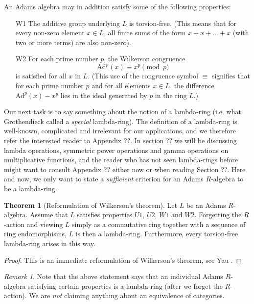 \documentclass[a4paper]{article}
\theoremstyle{definition}
\newtheorem{theorem}{Theorem}[section]
\theoremstyle{remark}
\newtheorem*{remark}{Remark}
\newcommand{\ad}[1]{\text{Ad}^{#1}}
\begin{document}
An Adams algebra may in addition satisfy some of the following properties:

\begin{itemize}
\item[W1] The additive group underlying $L$ is torsion-free. (This means that for every non-zero element $x \in L$, all finite sums of the form $x+x+ \ldots +x$ (with two or more terms) are also non-zero).
\item[W2] For each prime number $p$, the Wilkerson congruence
$$  \ad{p}(x) \equiv x^p \pmod p  $$
is satisfied for all $x$ in $L$. (This use of the congruence symbol $\equiv$ signifies that for each prime number $p$ and for all elements $x \in L$, the difference $\ad{p}(x) -  x^p$ lies in the ideal generated by $p$ in the ring $L$.)
\end{itemize}

Our next task is to say something about the notion of a lambda-ring (i.e. what Grothendieck called a \emph{special} lambda-ring). The definition of a lambda-ring is well-known, complicated and irrelevant for our applications, and we therefore refer the interested reader to Appendix ??. In section ?? we will be discussing lambda operations, symmetric power operations and gamma operations on multiplicative functions, and the reader who has not seen lambda-rings before might want to consult Appendix ?? either now or when reading Section ??. Here and now, we only want to state a \emph{sufficient} criterion for an Adams $R$-algebra to be a lambda-ring.

\begin{theorem}[Reformulation of Wilkerson's theorem]
Let $L$ be an Adams $R$-algebra. Assume that $L$ satisfies properties $U1$, $U2$, $W1$ and $W2$. Forgetting the $R$-action and viewing $L$ simply as a commutative ring together with a sequence of ring endomorphisms, $L$ is then a lambda-ring. Furthermore, every torsion-free lambda-ring arises in this way. 
\end{theorem}
\begin{proof}
This is an immediate reformulation of Wilkerson's theorem, see Yau \cite[Theorem ??]{Yau}.
\end{proof}
\begin{remark}
Note that the above statement says that an individual Adams $R$-algebra satisfying certain properties is a lambda-ring (after we forget the $R$-action). We are \emph{not} claiming anything about an equivalence of categories.
\end{remark}
\end{document}
